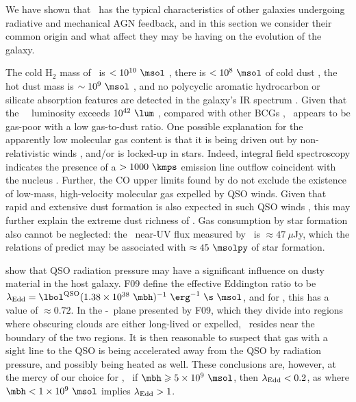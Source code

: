 \documentclass[useAMS,usenatbib]{mn2e}
\begin{document}
We have shown that \irs\ has the typical characteristics of other
galaxies undergoing radiative and mechanical AGN feedback, and in this
section we consider their common origin and what affect they may be
having on the evolution of the galaxy.

The cold H$_2$ mass of \irs\ is $< 10^{10} ~\msol$
\citep{1998ApJ...506..205E}, there is $< 10^8 ~\msol$ of cold dust
\citep{2001MNRAS.326.1467D}, the hot dust mass is $\sim 10^9 ~\msol$
\citep{1997A&A...318L...1T}, and no polycyclic aromatic hydrocarbon or
silicate absorption features are detected in the galaxy's IR spectrum
\citep{2004ApJ...613..986P, 2008ApJ...683..114S}. Given that the
\irs\ \halpha\ luminosity exceeds $10^{42} ~\lum$
\citep{1996MNRAS.283.1003C, 1998ApJ...506..205E}, compared with other
BCGs \citep[\eg][]{edge01}, \irs\ appears to be gas-poor with a low
gas-to-dust ratio. One possible explanation for the apparently low
molecular gas content is that it is being driven out by
non-relativistic winds \citep[\eg][]{2010MNRAS.401....7H}, and/or is
locked-up in stars. Indeed, integral field spectroscopy indicates the
presence of a $> 1000 ~\kmps$ emission line outflow coincident with
the nucleus \citep{1996MNRAS.283.1003C}. Further, the CO upper limits
found by \citet{1998ApJ...506..205E} do not exclude the existence of
low-mass, high-velocity molecular gas expelled by QSO winds. Given
that rapid and extensive dust formation is also expected in such QSO
winds \citep{2002ApJ...567L.107E}, this may further explain the
extreme dust richness of \irs. Gas consumption by star formation also
cannot be neglected: the \irs\ near-UV flux measured by \galex\ is
$\approx 47 ~\mu$Jy, which the relations of \citet{kennicutt2} predict
may be associated with $\approx 45 ~\msolpy$ of star formation.

\citet[][hereafter F09]{2009MNRAS.394L..89F} show that QSO radiation
pressure may have a significant influence on dusty material in the
host galaxy. F09 define the effective Eddington ratio to be $\leff =
\lqso (1.38 \times 10^{38} ~\mbh)^{-1} ~\erg^{-1} ~\s ~\msol$, and for
\irs, this has a value of $\approx 0.72$. In the \nhobs-\leff\ plane
presented by F09, which they divide into regions where obscuring
clouds are either long-lived or expelled, \irs\ resides near the
boundary of the two regions. It is then reasonable to suspect that gas
with a sight line to the QSO is being accelerated away from the QSO by
radiation pressure, and possibly being heated as well. These
conclusions are, however, at the mercy of our choice for \mbh, \ie\ if
$\mbh \ge 5 \times 10^9 ~\msol$, then $\lambda_{\mathrm{Edd}} < 0.2$, as where $\mbh <
1 \times 10^9 ~\msol$ implies $\lambda_{\mathrm{Edd}} > 1$.
\end{document}
